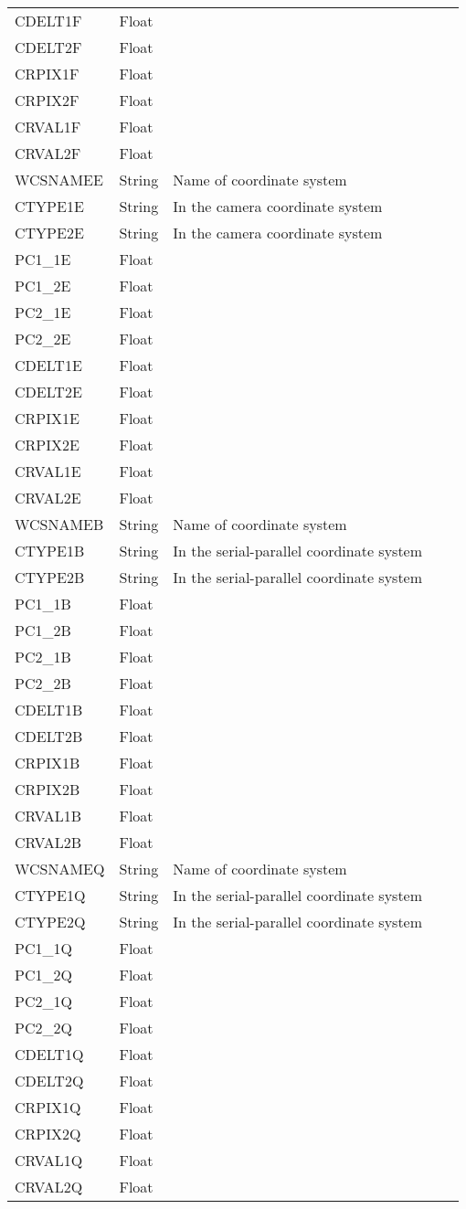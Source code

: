 \begin{tabular}{l l l l l}
CDELT1F & Float &  \\
CDELT2F & Float &  \\
CRPIX1F & Float &  \\
CRPIX2F & Float &  \\
CRVAL1F & Float &  \\
CRVAL2F & Float &  \\
WCSNAMEE & String & Name of coordinate system \\
CTYPE1E & String & In the camera coordinate system \\
CTYPE2E & String & In the camera coordinate system \\
PC1\_1E & Float &  \\
PC1\_2E & Float &  \\
PC2\_1E & Float &  \\
PC2\_2E & Float &  \\
CDELT1E & Float &  \\
CDELT2E & Float &  \\
CRPIX1E & Float &  \\
CRPIX2E & Float &  \\
CRVAL1E & Float &  \\
CRVAL2E & Float &  \\
WCSNAMEB & String & Name of coordinate system \\
CTYPE1B & String & In the serial-parallel coordinate system \\
CTYPE2B & String & In the serial-parallel coordinate system \\
PC1\_1B & Float &  \\
PC1\_2B & Float &  \\
PC2\_1B & Float &  \\
PC2\_2B & Float &  \\
CDELT1B & Float &  \\
CDELT2B & Float &  \\
CRPIX1B & Float &  \\
CRPIX2B & Float &  \\
CRVAL1B & Float &  \\
CRVAL2B & Float &  \\
WCSNAMEQ & String & Name of coordinate system \\
CTYPE1Q & String & In the serial-parallel coordinate system \\
CTYPE2Q & String & In the serial-parallel coordinate system \\
PC1\_1Q & Float &  \\
PC1\_2Q & Float &  \\
PC2\_1Q & Float &  \\
PC2\_2Q & Float &  \\
CDELT1Q & Float &  \\
CDELT2Q & Float &  \\
CRPIX1Q & Float &  \\
CRPIX2Q & Float &  \\
CRVAL1Q & Float &  \\
CRVAL2Q & Float &  \\
\hline
\end{tabular}

